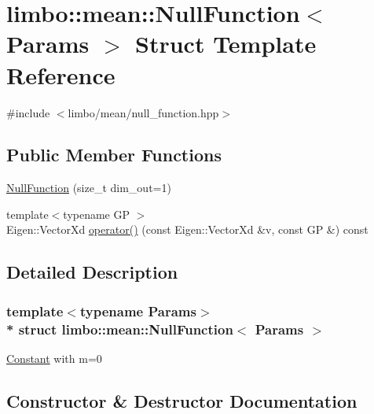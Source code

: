 \hypertarget{structlimbo_1_1mean_1_1_null_function}{}\section{limbo\+:\+:mean\+:\+:Null\+Function$<$ Params $>$ Struct Template Reference}
\label{structlimbo_1_1mean_1_1_null_function}


{\ttfamily \#include $<$limbo/mean/null\+\_\+function.\+hpp$>$}

\subsection*{Public Member Functions}
\begin{DoxyCompactItemize}
\item 
\hyperlink{structlimbo_1_1mean_1_1_null_function_a7b8f3fbf67e388da02ec7da8e745dd5a}{Null\+Function} (size\+\_\+t dim\+\_\+out=1)
\item 
{\footnotesize template$<$typename GP $>$ }\\Eigen\+::\+Vector\+Xd \hyperlink{structlimbo_1_1mean_1_1_null_function_ab7991314a2f799af4133653f95b8e58f}{operator()} (const Eigen\+::\+Vector\+Xd \&v, const GP \&) const 
\end{DoxyCompactItemize}


\subsection{Detailed Description}
\subsubsection*{template$<$typename Params$>$\\*
struct limbo\+::mean\+::\+Null\+Function$<$ Params $>$}

\hyperlink{structlimbo_1_1mean_1_1_constant}{Constant} with m=0 

\subsection{Constructor \& Destructor Documentation}
